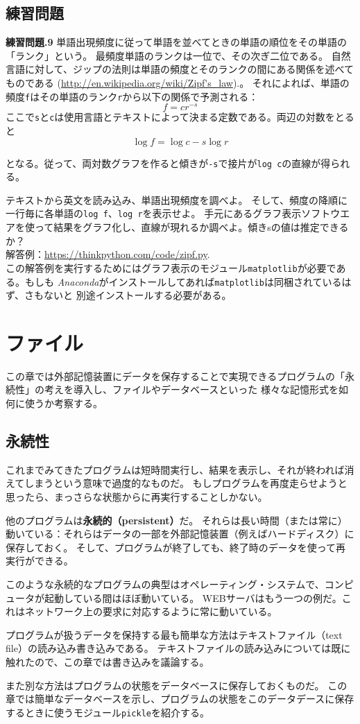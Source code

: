 \documentclass[a4j,12pt,makeidx]{jbook}
\newcommand{\tp}{\thechapter}
\begin{document}
\section{練習問題}
\noindent
{\bf 練習問題\tp.9} 単語出現頻度に従って単語を並べてときの単語の順位をその単語の「ランク」という。
最頻度単語のランクは一位で、その次ぎ二位である。
自然言語に対して、ジップの法則は単語の頻度とそのランクの間にある関係を述べてものである
(\url{http://en.wikipedia.org/wiki/Zipf's_law}).。
それによれば、単語の頻度{\tt f}はその単語のランク{\tt r}から以下の関係で予測される： \\
\[ f = c r^{-s} \]
 ここで{\tt s}と{\tt c}は使用言語とテキストによって決まる定数である。両辺の対数をとると \\
 \[ \log f = \log c - s \log r \]
 
となる。従って、両対数グラフを作ると傾きが{\tt -s}で接片が{\tt log c}の直線が得られる。\par
テキストから英文を読み込み、単語出現頻度を調べよ。
そして、頻度の降順に一行毎に各単語の{\tt log f}、{\tt log r}を表示せよ。
手元にあるグラフ表示ソフトウエアを使って結果をグラフ化し、直線が現れるか調べよ。傾きsの値は推定できるか？ \\
解答例：\url{https://thinkpython.com/code/zipf.py}. \\
この解答例を実行するためにはグラフ表示のモジュール{\tt matplotlib}が必要である。もしも
{\it Anaconda}がインストールしてあれば{\tt matplotlib}は同梱されているはず、さもないと
別途インストールする必要がある。
%
\chapter{ファイル}
この章では外部記憶装置にデータを保存することで実現できるプログラムの「永続性」の考えを導入し、ファイルやデータベースといった
様々な記憶形式を如何に使うか考察する。
%
\section{永続性}
これまでみてきたプログラムは短時間実行し、結果を表示し、それが終われば消えてしまうという意味で過度的なものだ。
もしプログラムを再度走らせようと思ったら、まっさらな状態からに再実行することしかない。 \par
他のプログラムは{\bf 永続的（persistent）}だ。
それらは長い時間（または常に）動いている：それらはデータの一部を外部記憶装置（例えばハードディスク）に保存しておく。
そして、プログラムが終了しても、終了時のデータを使って再実行ができる。\par
このような永続的なプログラムの典型はオペレーティング・システムで、コンピュータが起動している間はほぼ動いている。
WEBサーバはもう一つの例だ。これはネットワーク上の要求に対応するように常に動いている。\par
プログラムが扱うデータを保持する最も簡単な方法はテキストファイル（text file）の読み込み書き込みである。
テキストファイルの読み込みについては既に触れたので、この章では書き込みを議論する。 \par
また別な方法はプログラムの状態をデータベースに保存しておくものだ。
この章では簡単なデータベースを示し、プログラムの状態をこのデータデースに保存するときに使うモジュール{\tt pickle}を紹介する。
%
\end{document}
